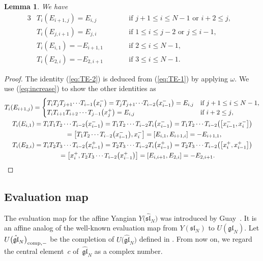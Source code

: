 \documentclass[pdftex]{sigma}
\newtheorem{lem}[thm]{Lemma}
\theoremstyle{definition}
\numberwithin{equation}{section}
\newcommand{\affY}{Y\big(\affsl\big)}
\newcommand{\gl}{\mathfrak{gl}}
\newcommand{\fraksl}{\mathfrak{sl}}
\newcommand{\affsl}{\hat{\mathfrak{sl}}_N}
\begin{document}
\begin{lem}We have
\begin{alignat}{3}
&T_i(E_{i+1,j})= E_{i,j} \qquad && \text{if $j+1 \leq i \leq N-1$ \ or \ $i+2 \leq j$}, & \label{eq:TE-1}\\
&T_i(E_{j,i+1})= E_{j,i} \qquad &&\text{if $1 \leq i \leq j-2$ \ or \ $j \leq i-1$}, & \label{eq:TE-2}\\
&T_i(E_{i,1})= -E_{i+1,1} \qquad &&\text{if $2 \leq i \leq N-1$}, & \label{eq:TE-3}\\
&T_i(E_{2,i})= -E_{2,i+1} \qquad &&\text{if $3 \leq i \leq N-1$}. & \label{eq:TE-4}
\end{alignat}
\end{lem}
\begin{proof}The identity (\ref{eq:TE-2}) is deduced from (\ref{eq:TE-1}) by applying $\omega$. We use (\ref{eq:increase}) to show the other identities as
\begin{gather*}
T_i(E_{i+1,j}) = \begin{cases}
T_i T_j T_{j+1} {\cdots} T_{i-1}\big(x_i^-\big) = T_j T_{j+1} {\cdots} T_{i-2} \big(x_{i-1}^-\big) = E_{i,j} &\text{if $j+1 \leq i \leq N-1$}, \\
T_i T_{i+1} T_{i+2} \cdots T_{j-1}\big(x_j^+\big) = E_{i,j} & \text{if $i+2 \leq j$},
\end{cases}
\\
T_i(E_{i,1}) = T_i T_{1} T_{2} \cdots T_{i-2}\big(x_{i-1}^-\big) = T_{1} T_{2} \cdots T_{i-2} T_i \big(x_{i-1}^-\big)= T_{1} T_{2} \cdots T_{i-2} \big(\big[x_{i-1}^-,x_i^-\big]\big)\\
\hphantom{T_i(E_{i,1})}{} = \big[T_{1} T_{2} \cdots T_{i-2} \big(x_{i-1}^-\big),x_i^-\big] = [E_{i,1}, E_{i+1,i}] = -E_{i+1,1},\\
T_i(E_{2,i}) = T_i T_{2} T_{3} \cdots T_{i-2}\big(x_{i-1}^+\big) = T_{2} T_{3} \cdots T_{i-2} T_i \big(x_{i-1}^+\big) = T_{2} T_{3} \cdots T_{i-2} \big(\big[x_{i}^+,x_{i-1}^+\big]\big)\\
\hphantom{T_i(E_{2,i})}{} = \big[x_i^+, T_{2} T_{3} \cdots T_{i-2} \big(x_{i-1}^+\big)\big] = [E_{i,i+1}, E_{2,i}] = -E_{2,i+1}.\tag*{\qed}
\end{gather*}\renewcommand{\qed}{}
\end{proof}

\subsection{Evaluation map}

The evaluation map for the affine Yangian $\affY$ was introduced by Guay~\cite{MR2323534}. It is an affine analog of the well-known evaluation map from $Y(\fraksl_N)$ to $U(\gl_N)$. Let $U\big(\hat{\gl}_N\big)_{{\rm comp},-}$ be the completion of ${U}\big(\hat{\gl}_N\big)$ defined in \cite[Definition~2.5]{kodera_evaluation}. From now on, we regard the central element~$c$ of~$\hat{\gl}_N$ as a complex number.
\end{document}
